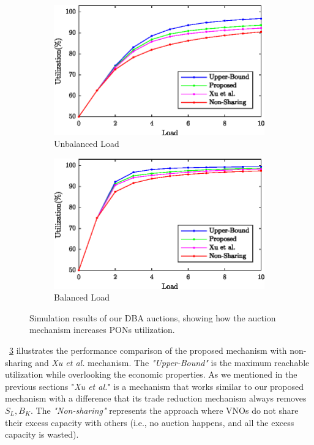 \begin{figure}[h]
\centering
\begin{subfigure}{0.7\columnwidth}
\includegraphics[width=\columnwidth]{Figures/fig1b}%
\caption{Unbalanced Load}%
\label{Unbalanced_Utilization}%
\end{subfigure}\hfill%
\begin{subfigure}{0.7\columnwidth}
\includegraphics[width=\columnwidth]{Figures/fig1a}%
\caption{Balanced Load}%
\label{Balanced_Utilization}%
\end{subfigure}\hfill%
\caption{Simulation results of our \ac{DBA} auctions, showing how the auction mechanism increases \acp{PON} utilization.}
\label{Utilization}%
\end{figure}

\figureautorefname~\ref{Utilization} illustrates the performance comparison of the proposed mechanism with non-sharing and \textit{Xu et al.} \cite{5462277} mechanism. The \textit{"Upper-Bound"} is the maximum reachable utilization while overlooking the economic properties. As we mentioned in the previous sections "\textit{Xu et al.}" is a mechanism that works similar to our proposed mechanism with a difference that its trade reduction mechanism always removes $S_L , B_K$. The \textit{"Non-sharing"} represents the approach where \acp{VNO} do not share their excess capacity with others (i.e., no auction happens, and all the excess capacity is wasted).

